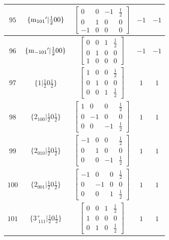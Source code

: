 \documentclass[fleqn,8pt]{jsarticle}
\begin{document}
\begin{longtable}{ccccc}
$ 95 $ & $ \{{\rm m}_{101}{}'|\frac{1}{2} 0 0\} $ & $ \begin{bmatrix} 0 & 0 & -1 & \frac{1}{2} \\ 0 & 1 & 0 & 0 \\ -1 & 0 & 0 & 0 \end{bmatrix} $ & $ -1 $ & $ -1 $ \\ \hline
$ 96 $ & $ \{{\rm m}_{-101}{}'|\frac{1}{2} 0 0\} $ & $ \begin{bmatrix} 0 & 0 & 1 & \frac{1}{2} \\ 0 & 1 & 0 & 0 \\ 1 & 0 & 0 & 0 \end{bmatrix} $ & $ -1 $ & $ -1 $ \\ \hline
$ 97 $ & $ \{1|\frac{1}{2} 0 \frac{1}{2}\} $ & $ \begin{bmatrix} 1 & 0 & 0 & \frac{1}{2} \\ 0 & 1 & 0 & 0 \\ 0 & 0 & 1 & \frac{1}{2} \end{bmatrix} $ & $ 1 $ & $ 1 $ \\ \hline
$ 98 $ & $ \{2{}_{100}|\frac{1}{2} 0 \frac{1}{2}\} $ & $ \begin{bmatrix} 1 & 0 & 0 & \frac{1}{2} \\ 0 & -1 & 0 & 0 \\ 0 & 0 & -1 & \frac{1}{2} \end{bmatrix} $ & $ 1 $ & $ 1 $ \\ \hline
$ 99 $ & $ \{2{}_{010}|\frac{1}{2} 0 \frac{1}{2}\} $ & $ \begin{bmatrix} -1 & 0 & 0 & \frac{1}{2} \\ 0 & 1 & 0 & 0 \\ 0 & 0 & -1 & \frac{1}{2} \end{bmatrix} $ & $ 1 $ & $ 1 $ \\ \hline
$ 100 $ & $ \{2{}_{001}|\frac{1}{2} 0 \frac{1}{2}\} $ & $ \begin{bmatrix} -1 & 0 & 0 & \frac{1}{2} \\ 0 & -1 & 0 & 0 \\ 0 & 0 & 1 & \frac{1}{2} \end{bmatrix} $ & $ 1 $ & $ 1 $ \\ \hline
$ 101 $ & $ \{3^{+}_{\,\,111}|\frac{1}{2} 0 \frac{1}{2}\} $ & $ \begin{bmatrix} 0 & 0 & 1 & \frac{1}{2} \\ 1 & 0 & 0 & 0 \\ 0 & 1 & 0 & \frac{1}{2} \end{bmatrix} $ & $ 1 $ & $ 1 $ \\ \hline

\end{longtable}
\end{document}
